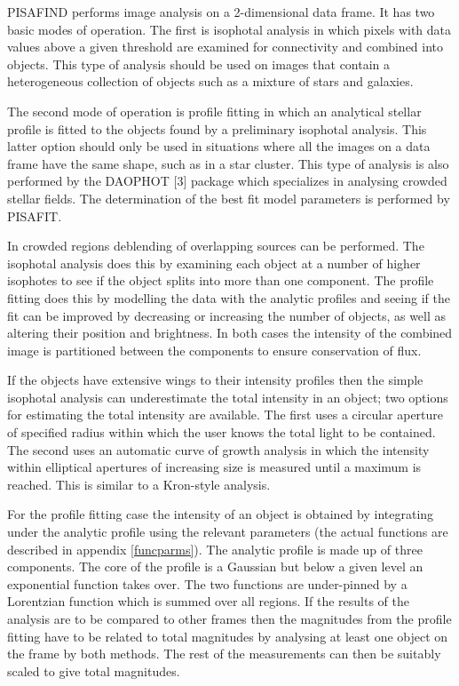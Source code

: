PISAFIND performs image analysis on a 2-dimensional data frame. It has
two basic modes of operation. The first is isophotal analysis in
which pixels with data values above a given threshold are examined for
connectivity and combined into objects. This type of analysis should be
used on images that contain a heterogeneous collection of objects such
as a mixture of stars and galaxies.

The second mode of operation is profile fitting in which an analytical
stellar profile is fitted to the objects found by a preliminary
isophotal analysis. This latter option should only be used in situations
where all the images on a data frame have the same shape, such as in a
star cluster. This type of analysis is also performed by the DAOPHOT
[3] package which specializes in analysing crowded stellar fields.
The determination of the best fit model parameters is performed by 
PISAFIT.

In crowded regions deblending of overlapping sources can be performed.
The isophotal analysis does this by examining each object at a number of
higher isophotes to see if the object splits into more than one
component. The profile fitting does this by modelling the data with the
analytic profiles and seeing if the fit can be improved by decreasing or
increasing the number of objects, as well as altering their position and
brightness. In both cases the intensity of the combined image is
partitioned between the components to ensure conservation of flux.

If the objects have extensive wings to their intensity profiles then the
simple isophotal analysis can underestimate the total intensity in an
object; two options for estimating the total intensity are available.
The first uses a circular aperture of specified radius within which the
user knows the total light to be contained. The second uses an automatic
curve of growth analysis in which the intensity within elliptical
apertures of increasing size is measured until a maximum is reached.
This is similar to a Kron-style analysis.

For the profile fitting case the intensity of an object is obtained by
integrating under the analytic profile using the relevant parameters
(the actual functions are described in appendix \ref{funcparms}). The
analytic profile is made up of three components. The core of the profile
is a Gaussian but below a given level an exponential function
takes over. The two functions are under-pinned by a Lorentzian function
which is summed over all regions. If the results of the analysis are to
be compared to other frames then the magnitudes from the profile fitting
have to be related to total magnitudes by analysing at least one object
on the frame by both methods. The rest of the measurements can then be
suitably scaled to give total magnitudes.

